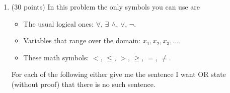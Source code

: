 \documentclass[12pt]{article}
\newcommand{\D}{\mathbb{D}}
\begin{document}
\begin{enumerate}
\begin{enumerate}
\item
(10 points)
$\D$ satisfies all the following properties
\begin{enumerate}
    \item $\D$ has a least element.
    \item $\D$ has a greatest element.
    \item Every element in $\D$ except the least has a predecessor.
    \item Every element in $\D$ except the greatest has a successor.
    \begin{itemize}
        \item {}
        \item \textbf{\{1,2,3,4,5\}}
    \end{itemize}
\end{enumerate} (So the question here is to determine
if such a $\D$ exists, and either give me the $\D$ or state, without proof, there is no $\D$.)
\end{enumerate}


\ifshowsoln



\fi 

\vfill

\centerline{\bf GO TO NEXT PAGE} 

\newpage

\item
(30 points)
In this problem the only symbols you can use are 

\begin{itemize}
\item 
The usual logical ones: $\forall$, $\exists$ $\wedge$, $\vee$, $\neg$.
\item 
Variables that range over the domain: $x_1,x_2,x_3,\ldots$.
\item
These math symbols: $<$, $\le$, $>$, $\ge$, $=$, $\ne$.
\end{itemize}

For each of the following either give me the sentence I want OR
state (without proof) that there is no such sentence. 


\end{enumerate}
\end{document}
